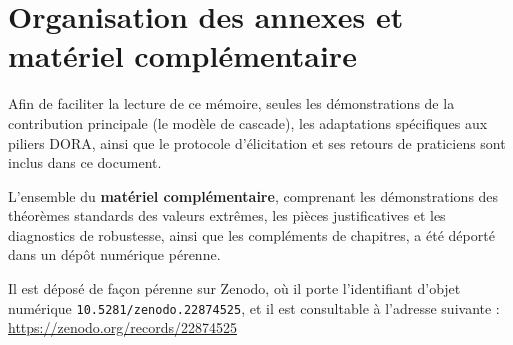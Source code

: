 \documentclass[12pt,a4paper]{report}
\begin{document}
\chapter*{Organisation des annexes et matériel complémentaire}

Afin de faciliter la lecture de ce mémoire, seules les démonstrations de la contribution
principale (le modèle de cascade), les adaptations spécifiques aux piliers DORA,
ainsi que le protocole d'élicitation et ses retours de praticiens sont inclus dans ce
document.

L'ensemble du \textbf{matériel complémentaire}, comprenant les démonstrations des théorèmes
standards des valeurs extrêmes, les pièces justificatives et les diagnostics de robustesse,
ainsi que les compléments de chapitres, a été déporté dans un dépôt numérique pérenne.

Il est déposé de façon pérenne sur Zenodo, où il porte l'identifiant d'objet numérique
\texttt{10.5281/zenodo.22874525}, et il est consultable à l'adresse suivante :
\url{https://zenodo.org/records/22874525}




{\NoAutoSpacing}

\end{document}
